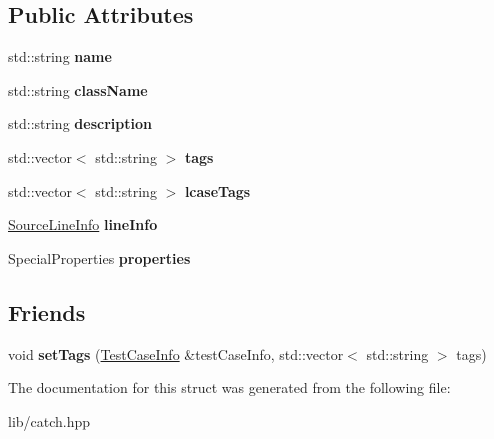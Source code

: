 \subsection*{Public Attributes}
\begin{DoxyCompactItemize}
\item 
\mbox{\label{struct_catch_1_1_test_case_info_a463794e2f5cfead307c93efd134ade36}} 
std\+::string {\bfseries name}
\item 
\mbox{\label{struct_catch_1_1_test_case_info_a1a5e0825132a38d091defdebbf2f8ce9}} 
std\+::string {\bfseries class\+Name}
\item 
\mbox{\label{struct_catch_1_1_test_case_info_a37fe2db9425bc45f6a33893eac31198e}} 
std\+::string {\bfseries description}
\item 
\mbox{\label{struct_catch_1_1_test_case_info_a150a7cbca1dd0c91799ccb14ff822eb0}} 
std\+::vector$<$ std\+::string $>$ {\bfseries tags}
\item 
\mbox{\label{struct_catch_1_1_test_case_info_a844e3de9baf6e53cadfba9733c236bfe}} 
std\+::vector$<$ std\+::string $>$ {\bfseries lcase\+Tags}
\item 
\mbox{\label{struct_catch_1_1_test_case_info_aa9407b7f442655b51a2aad24b3fa2fd3}} 
\mbox{\hyperlink{struct_catch_1_1_source_line_info}{Source\+Line\+Info}} {\bfseries line\+Info}
\item 
\mbox{\label{struct_catch_1_1_test_case_info_afc1e84bd7a2e180895a06d9131302af0}} 
Special\+Properties {\bfseries properties}
\end{DoxyCompactItemize}
\subsection*{Friends}
\begin{DoxyCompactItemize}
\item 
\mbox{\label{struct_catch_1_1_test_case_info_a0fe44abaf18ae7c26f98a9fc2b08679c}} 
void {\bfseries set\+Tags} (\mbox{\hyperlink{struct_catch_1_1_test_case_info}{Test\+Case\+Info}} \&test\+Case\+Info, std\+::vector$<$ std\+::string $>$ tags)
\end{DoxyCompactItemize}


The documentation for this struct was generated from the following file\+:\begin{DoxyCompactItemize}
\item 
lib/catch.\+hpp\end{DoxyCompactItemize}
